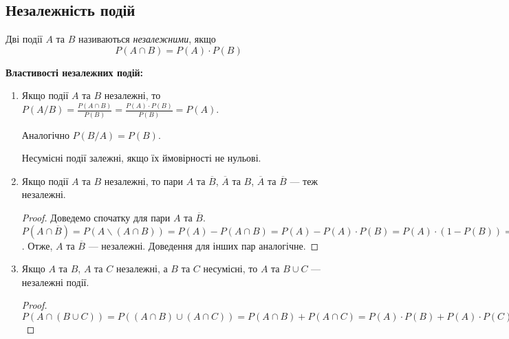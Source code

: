 \subsection{Незалежність подій}
\begin{definition}
    Дві події $A$ та $B$ називаються \emph{незалежними}, якщо
    \begin{equation}
        P(A\cap B) = P(A)\cdot P(B)
    \end{equation}
\end{definition}
\noindent \textbf{Властивості незалежних подій:}
\begin{enumerate}
    \item Якщо події $A$ та $B$ незалежні, то $P(A/B) = \frac{P(A\cap B)}{P(B)} = \frac{P(A)\cdot P(B)}{P(B)} = P(A)$.
    
    Аналогічно $P(B/A) = P(B)$.
    \begin{remark}
        Несумісні події залежні, якщо їх ймовірності не нульові.
    \end{remark}

    \item Якщо події $A$ та $B$ незалежні, то пари $A$ та $\overline{B}$, 
    $\overline{A}$ та $B$, $\overline{A}$ та $\overline{B}$ --- теж незалежні.
    \begin{proof}
        Доведемо спочатку для пари $A$ та $\overline{B}$. $P(A\cap \overline{B}) = P(A\backslash (A\cap B)) = P(A) - P(A\cap B) = P(A) - P(A)\cdot P(B) = P(A)\cdot (1 - P(B)) = P(A)\cdot P(\overline{B})$.
        Отже, $A$ та $\overline{B}$ --- незалежні. Доведення для інших пар аналогічне.
    \end{proof}
    \item Якщо $A$ та $B$, $A$ та $C$ незалежні, а $B$ та $C$ несумісні, то $A$ та $B\cup C$ --- незалежні події.
    \begin{proof}
        $P(A\cap (B \cup C)) = P((A \cap B) \cup (A \cap C)) = P(A\cap B) + P(A\cap C) = P(A)\cdot P(B) + P(A)\cdot P(C) = P(A) \cdot (P(B) + P(C)) = P(A)\cdot P(B\cup C).$
    \end{proof}
\end{enumerate}

